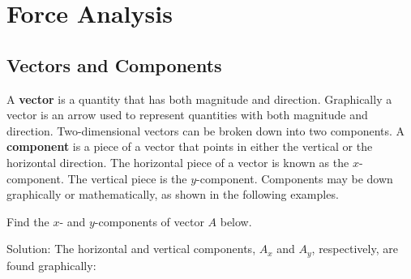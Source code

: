 \documentclass{article}
\begin{document}
\section{Force Analysis}

\subsection{Vectors and Components}

A \textbf{vector} is a quantity that has both magnitude and direction. Graphically a vector is an arrow used to represent quantities with both magnitude and direction. Two-dimensional vectors can be broken down into two components. A \textbf{component} is a piece of a vector that points in either the vertical or the horizontal direction. The horizontal piece of a vector is known as the $x$-component. The vertical piece is the $y$-component. Components may be down graphically or mathematically, as shown in the following examples.

\begin{example}
    Find the $x$- and $y$-components of vector $A$ below.
\end{example}

\begin{center}
\def\Ax{6}
\def\Ay{4}
\end{center}

\clearpage
Solution: The horizontal and vertical components, $A_x$ and $A_y$, respectively, are found graphically:

\begin{center}
\def\Ax{6}
\def\Ay{4}
\end{center}
\end{document}
